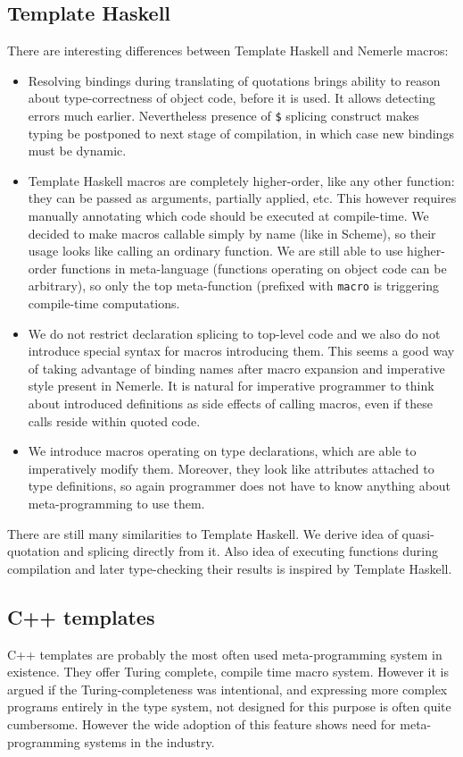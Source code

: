 \documentclass{llncs}
\begin{document}
\subsection{Template Haskell}
There are interesting differences between Template Haskell \cite{Haskell:Meta} 
and Nemerle macros:
\begin{itemize}
\item Resolving bindings during translating of quotations brings ability to reason
  about type-correctness of object code, before it is used. It allows detecting
  errors much earlier. Nevertheless presence of \verb,$, splicing construct makes %
  typing be postponed to next stage of compilation, in which case new bindings 
  must be dynamic.
\item Template Haskell macros are completely higher-order, like any other 
  function: they can be passed as arguments, partially applied, etc. This
  however requires manually annotating which code should be executed at 
  compile-time. We decided to make macros callable simply by name (like in Scheme), 
  so their usage looks like calling an ordinary function. We are still able to use 
  higher-order functions in meta-language (functions operating on object code can 
  be arbitrary), so only the top meta-function (prefixed with \verb,macro, is 
  triggering compile-time computations.
\item We do not restrict declaration splicing to top-level code and we also do not
  introduce special syntax for macros introducing them. This seems a good way of
  taking advantage of binding names after macro expansion and imperative style
  present in Nemerle. It is natural for imperative programmer to think about introduced 
  definitions as side effects of calling macros, even if these calls reside within
  quoted code.
\item We introduce macros operating on type declarations, which are able to imperatively
  modify them. Moreover, they look like attributes attached to type definitions, so
  again programmer does not have to know anything about meta-programming to use them.
\end{itemize}

There are still many similarities to Template Haskell. We derive idea of quasi-quotation
and splicing directly from it. Also idea of executing functions during compilation
and later type-checking their results is inspired by Template Haskell.

\subsection{C++ templates}
C++ templates are probably the most often used meta-programming system
in existence. They offer Turing complete, compile time macro system.
However it is argued if the Turing-completeness was intentional,
and expressing more complex programs entirely in the type system,
not designed for this purpose is often quite cumbersome.
However the wide adoption of this feature shows need for meta-programming
systems in the industry.
\end{document}
